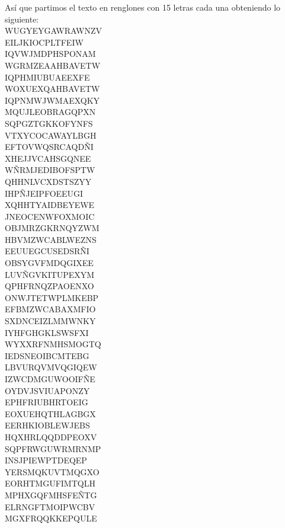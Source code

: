 \documentclass[12pt, letterpaper]{article}
\begin{document}
Así que partimos el texto en renglones con 15 letras cada una obteniendo lo siguiente:\\
WUGYEYGAWRAWNZV\\
EILJKIOCPLTFEIW\\
IQVWJMDPHSPONAM\\
WGRMZEAAHBAVETW\\
IQPHMIUBUAEEXFE\\
WOXUEXQAHBAVETW\\
IQPNMWJWMAEXQKY\\
MQUJLEOBRAGQPXN\\
SQPGZTGKKOFYNFS\\
VTXYCOCAWAYLBGH\\
EFTOVWQSRCAQDÑI\\
XHEJJVCAHSGQNEE\\
WÑRMJEDIBOFSPTW\\
QHHNLVCXDSTSZYY\\
IHPÑJEIPFOEEUGI\\
XQHHTYAIDBEYEWE\\
JNEOCENWFOXMOIC\\
OBJMRZGKRNQYZWM\\
HBVMZWCABLWEZNS\\
EEUUEGCUSEDSRÑI\\
OBSYGVFMDQGIXEE\\
LUVÑGVKITUPEXYM\\
QPHFRNQZPAOENXO\\
ONWJTETWPLMKEBP\\
EFBMZWCABAXMFIO\\
SXDNCEIZLMMWNKY\\
IYHFGHGKLSWSFXI\\
WYXXRFNMHSMOGTQ\\
IEDSNEOIBCMTEBG\\
LBVURQVMVQGIQEW\\
IZWCDMGUWOOIFÑE\\
OYDVJSVIUAPONZY\\
EPHFRIUBHRTOEIG\\
EOXUEHQTHLAGBGX\\
EERHKIOBLEWJEBS\\
HQXHRLQQDDPEOXV\\
SQPFRWGUWRMRNMP\\
INSJPIEWPTDEQEP\\
YERSMQKUVTMQGXO\\
EORHTMGUFIMTQLH\\
MPHXGQFMHSFEÑTG\\
ELRNGFTMOIPWCBV\\
MGXFRQQKKEPQULE\\
\end{document}
